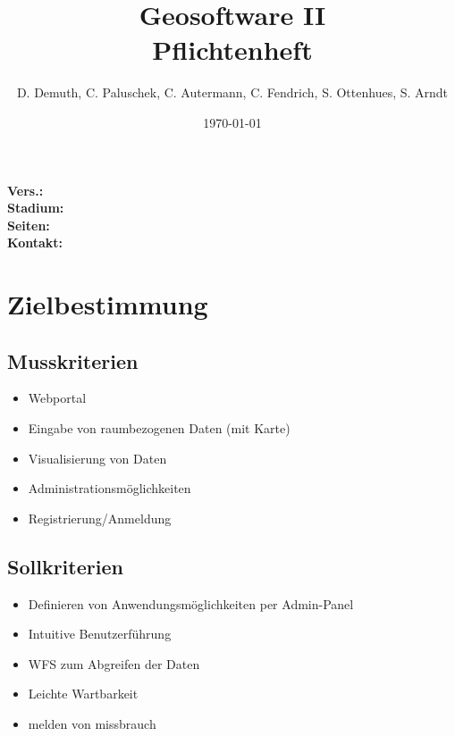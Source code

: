 \documentclass[a4paper,11pt]{article}             %
\begin{document}
\title{Geosoftware II \\ \small Pflichtenheft}
\author{D. Demuth, C. Paluschek, C. Autermann, C. Fendrich, S. Ottenhues, S. Arndt}
\date{\today}
\maketitle
\thispagestyle{empty}

\begin{center}
\bf Vers.: \MyVersion \\
\bf Stadium: \MyStatus\\
\bf Seiten: \thelastpage \\
\bf Kontakt: \email \\
\end{center}
\newpage

\tableofcontents

\newpage

\section{Zielbestimmung}
	\subsection{Musskriterien}
		\begin{itemize}
			\item Webportal
			\item Eingabe von raumbezogenen Daten (mit Karte)
			\item Visualisierung von Daten
			\item Administrationsmöglichkeiten
			\item Registrierung/Anmeldung
		\end{itemize}
	\subsection{Sollkriterien}
		\begin{itemize}
			\item Definieren von Anwendungsmöglichkeiten per Admin-Panel
			\item Intuitive Benutzerführung
			\item WFS zum Abgreifen der Daten
			\item Leichte Wartbarkeit
			\item melden von missbrauch
		\end{itemize}
\end{document}
